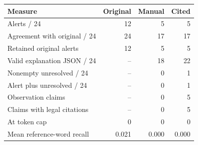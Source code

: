 \begin{tabular}{lrrr}\toprule
Measure & Original & Manual & Cited\\\midrule
Alerts / 24 & 12 & 5 & 5\\
Agreement with original / 24 & 24 & 17 & 17\\
Retained original alerts & 12 & 5 & 5\\
Valid explanation JSON / 24 & -- & 18 & 22\\
Nonempty unresolved / 24 & -- & 0 & 1\\
Alert plus unresolved / 24 & -- & 0 & 1\\
Observation claims & -- & 0 & 5\\
Claims with legal citations & -- & 0 & 5\\
At token cap & 0 & 0 & 0\\
Mean reference-word recall & 0.021 & 0.000 & 0.000\\
\bottomrule\end{tabular}
